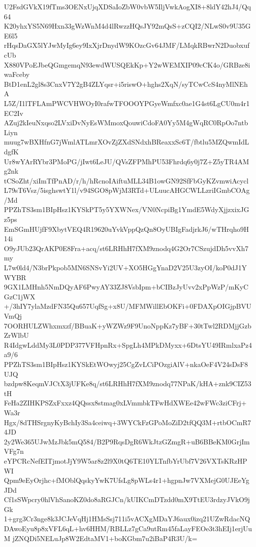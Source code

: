 U2FsdGVkX19fTms3OENxUjqXDSaIoZbW0vbW5IljVwkAogXI8+8ldY42hJ4/Qq64
K20yhxYS5N69Hxn33gWzWnM4d4lRwzzHQsJY92mQsS+zCQI2/NLwS0v9U35GE6l5
rHqsDaGX5lYJwMyIg6ey9IxXjrDnydW9KOzcGv64JMF/LMqkRBwrN2DuobxufcUb
X880VPoEJbeQGmgemqN93ewdWUSQEkKp+Y2wWEMXIP09cCK4o/GRBze8iwaFceby
BtD1enL2gl8s3CnxV7Y2gB4ZLYqsr+i5riswO+hghs2XqN/syTCwCcS4nyMlNEhA
L5Z/I1lTFLAmPWCVHWOyI0rafwTFOOOYPGyeWmfxc0ae1G4st6LgCU0m4r1EC2Iv
AZuj2kIeuNxqso2LVxiDvNyEsWMmoxQouwiCdoFA0Yy5M4gWqRC0RpOo7ntbLiyn
muug7wBXHfnG7jWmlATLmrXOvZjZXdSNdxhBReaxxSc6T/fbtlu5MZQwmIdLdgfK
Ur8wYArRYbr3PMoPG/jIwt6LeJU/QVsZFPMhPU53Fhrdq6y0j7Z+Z5yTR4AMg2nk
tCSoZht/xiImTfPnAD/r/h/hRcnoIAiftuMLL34B1owGN92SfFbGyKZvmwiAcycl
L79sT6Vsz/5isghswtY1l/v94SGO8pWjM3RTd+ULuucAHGCWLLzriIGmbCOAg/Md
PPZhTS3sm1BIpHsz1KYSkPT5y5YXWNex/VN0NcpiBg1YmdE5WdyXjjzxixJGz5ps
EmSGmHUjfF9XbytVEQ4R19620uYvkVppQzQn8OyUBIgFadjrkJ6/wTHrqho9H14i
O9yJUb23QrAKP0E8Fra+acq/st6LRHhH7fXM9znodq4G2Or7CSzujdDh5vvXh7my
L7w0ld4/N3brPkpob5MN6SNSvYi2UV+XO5HGgYnaD2V25U3zyOI/koP0dJ1YWYBR
9GX1LMHnh5NmDQyAF6PwyAY33ZJ8VsbIpm+bCIBzJyUvv2xPpWzP/mKyCGzC1jWX
+/3hIY7ylaMzdFN35Qu657UqfSg+x8U/MFMWillEbOKFi+0FDAXpOIGjpBVUVmQj
7OORHULZWhxmxzf/BBuaK+yWZWz9F9UnoNppKz7yBF+30tTwl2RDMjjGzbZrWlbU
R4IdgwLddMy3L0PDP377VFHpnRx+SpgLh4MPkDMyxx+6DtsYU49IRmlxaPz4a9/6
PPZhTS3sm1BIpHsz1KYSkEtWOwyj25CgZvLCiPOzgiAlV+nkaOeF4V24sDsF8UJQ
bzdpw8KeqmVJCtX3jUFKe8q/st6LRHhH7fXM9znodq77NPaK/kHA+znk9CIZ53tH
FeHa2ZIHKPSZxFxxz4QQssx8stmag0xLVmmbkTFwHdXWEe42wFWc3ziCFrj+Wa3r
Hgx/8dTHSrgnyKyBchIy3Sa4ceiwq+3WYCkFzGPoMoZiD2tfQQ3M+rtbOCmR74JD
2y2We365UJwMzJbk5mQ584/B2P9RqsDgR6WkJtzGZmgR+uB6BBeKM0GrjImVFg7n
eYPCRcNefEITjmotJjY9W5ar8z2l9X0tQ6TE10YLTnfbYrUbf7V26VXTsKRzHPWI
Qpm9eEyOrjhc+fMOblQqskyYwK7UfsLg8pWLs4r1+hgpnJw7VXMejG0UJEeYgJDd
Cf1sSWpcry0hlVhSanoKZ0do8aRGJCn/kUIKCmDTzdd0mX9TtEU3rdzyJVkO9jGk
1+grg3Cr3nge8k3JCJeVqHj1HMsSsj711i5vACXgMDaYJ6aux0izq21UZwRdacNQ
DAwoEyu8p8xVFL6qL+hv6HHM/RBLLz7gCa9utRm45faLayFEOe3t3hEIj1erjUuM
jZNQDi5NELuJp8W2EdtaMV1+boKGbm7u2iBaP4R3U/k=
